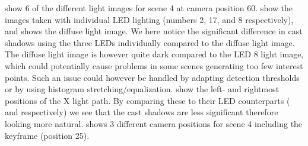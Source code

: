 \documentclass[thesis.tex]{subfiles}
\begin{document}
 show 6 of the different light images for scene 4 at camera position 60.  show the images taken with individual LED lighting (numbers 2, 17, and 8 respectively), and  shows the diffuse light image. We here notice the significant difference in cast shadows using the three LEDs individually compared to the diffuse light image. The diffuse light image is however quite dark compared to the LED 8 light image, which could potentially cause problems in some scenes generating too few interest points. Such an issue could however be handled by adapting detection thresholds or by using histogram stretching/equalization.
 show the left- and rightmost positions of the X light path. By comparing these to their LED counterparts ( and  respectively) we see that the cast shadows are less significant therefore looking more natural.
 shows 3 different camera positions for scene 4 including the keyframe (position 25).
%
\end{document}
